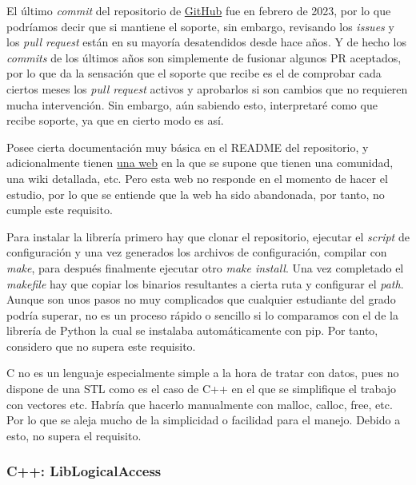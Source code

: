 \begin{todolist}
    \item [\xcmark] El último \emph{commit} del repositorio de
    \href{https://github.com/nfc-tools/libnfc}{GitHub} fue en febrero de 2023,
    por lo que podríamos decir que si mantiene el soporte, sin embargo,
    revisando los \emph{issues} y los \emph{pull request} están en su mayoría
    desatendidos desde hace años. Y de hecho los \emph{commits} de los últimos años son
    simplemente de fusionar algunos PR aceptados, por lo que da la sensación que
    el soporte que recibe es el de comprobar cada ciertos meses los \emph{pull
    request} activos y aprobarlos si son cambios que no requieren mucha
    intervención. Sin embargo, aún sabiendo esto, interpretaré como que recibe
    soporte, ya que en cierto modo es así.
    \item Posee cierta documentación muy básica en el README del repositorio, y
    adicionalmente tienen \href{nfc-tools.org}{una web} en la que se supone que
    tienen una comunidad, una wiki detallada, etc. Pero esta web no responde en
    el momento de hacer el estudio, por lo que se entiende que la web ha sido
    abandonada, por tanto, no cumple este requisito.
    \item Para instalar la librería primero hay que clonar el repositorio,
    ejecutar el \emph{script} de configuración y una vez generados los archivos
    de configuración, compilar con \emph{make}, para después finalmente ejecutar otro
    \emph{make install}. Una vez completado el \emph{makefile} hay que copiar los binarios
    resultantes a cierta ruta y configurar el \emph{path}. Aunque son unos pasos
    no muy complicados que cualquier estudiante del grado podría superar, no es
    un proceso rápido o sencillo si lo comparamos con el de la librería de
    Python la cual se instalaba automáticamente con pip. Por tanto, considero que
    no supera este requisito.
    \item C no es un lenguaje especialmente simple a la hora de tratar con
    datos, pues no dispone de una STL como es el caso de C++ en el que se
    simplifique el trabajo con vectores etc. Habría que hacerlo manualmente con
    malloc, calloc, free, etc. Por lo que se aleja mucho de la simplicidad o
    facilidad para el manejo. Debido a esto, no supera el requisito.
\end{todolist}

\subsubsection{C++: LibLogicalAccess}

